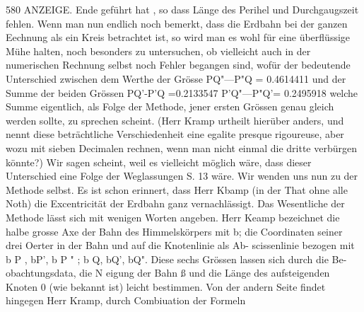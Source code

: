 \documentclass[12pt,a4paper]{article}
\begin{document}
\newpage
580 ANZEIGE.\newline
Ende geführt hat , so dass Länge des Perihel und Durchgaugszeit fehlen. Wenn man nun endlich noch\newline
bemerkt, dass die Erdbahn bei der ganzen Eechnung als ein Kreis betrachtet ist, so wird man es wohl\newline
für eine überflüssige Mühe halten, noch besonders zu untersuchen, ob vielleicht auch in der numerischen\newline
Rechnung selbst noch Fehler begangen sind, wofür der bedeutende Unterschied zwischen dem Werthe\newline
der Grösse\newline
PQ"---P"Q = 0.4614411\newline
und der Summe der beiden Grössen PQ'-P'Q =0.2133547\newline
P'Q"---P"Q'= 0.2495918\newline
welche Summe eigentlich, als Folge der Methode, jener ersten Grössen genau gleich werden sollte, zu\newline
sprechen scheint. (Herr Kramp urtheilt hierüber anders, und nennt diese beträchtliche Verschiedenheit\newline
eine egalite presque rigoureuse, aber wozu mit sieben Decimalen rechnen, wenn man nicht einmal die\newline
dritte verbürgen könnte?) Wir sagen scheint, weil es vielleicht möglich wäre, dass dieser Unterschied\newline
eine Folge der Weglassungen S. 13 wäre.\newline
Wir wenden uns nun zu der Methode selbst. Es ist schon erinnert, dass Herr Kbamp (in der\newline
That ohne alle Noth) die Excentricität der Erdbahn ganz vernachlässigt. Das Wesentliche der Methode\newline
lässt sich mit wenigen Worten angeben. Herr Keamp bezeichnet die halbe grosse Axe der Bahn des\newline
Himmelskörpers mit b; die Coordinaten seiner drei Oerter in der Bahn und auf die Knotenlinie als Ab-\newline
scissenlinie bezogen mit b P , bP', b P " ; b Q, bQ', bQ". Diese sechs Grössen lassen sich durch die Be-\newline
obachtungsdata, die N eigung der Bahn ß und die Länge des aufsteigenden Knoten 0 (wie bekannt ist)\newline
leicht bestimmen. Von der andern Seite findet hingegen Herr Kramp, durch Combiuation der Formeln\newline
\end{document}

